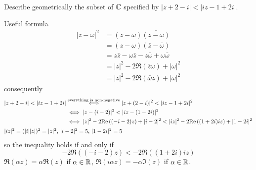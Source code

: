 \documentclass[10pt, a4paper]{article}
\begin{document}
\begin{problem}
    Describe geometrically the subset of $\C$ specified by $|z + 2 - i| < |iz - 1 + 2i|$.

    \begin{solution}
        Useful formula
        \begin{align*}
            |z - \omega| ^ 2 &= (z - \omega)\overline{(z - \omega)} \\
            &= (z - \omega)(\bar{z} - \bar{\omega}) \\
            &= z\bar{z} - \omega\bar{z} - z\bar{\omega} + \omega\bar{\omega} \\
            &= |z| ^ 2 - 2\Re(\bar{z}\omega) + |\omega| ^ 2 \\
            &= |z| ^ 2 - 2\Re(\bar{\omega}z) + |\omega| ^ 2
        \end{align*}
        consequently
        \begin{align*}
            |z + 2 - i| < |iz - 1 + 2i| &\overset{\text{everything is non-negative}}{\iff} |z + (2 - i)| ^ 2 < |iz - 1 + 2i| ^ 2 \\
            &\iff |z - (i - 2)| ^ 2 < |iz - (1 - 2i)| ^ 2 \\
            &\iff |z| ^ 2 - 2\Re((-i -2)z) + |i - 2| ^ 2 < |iz| ^ 2 - 2\Re((1 + 2i)iz) + |1 - 2i| ^ 2 \\
            \intertext{$|iz| ^ 2 = (|i||z|) ^ 2 = |z| ^ 2$,
            $|i - 2| ^ 2 = 5$,
            $|1 - 2i| ^ 2 = 5$}
        \end{align*}
        so the inequality holds if and only if
        \[
        -2\Re((-i - 2)z) < -2\Re((1 + 2i)iz)
        \]
        $\Re(\alpha z) = \alpha\Re(z)$ if $\alpha \in \R$,
        $\Re(i\alpha z) = -\alpha\Im(z)$ if $\alpha \in \R$.
    \end{solution}
\end{problem}
\end{document}
